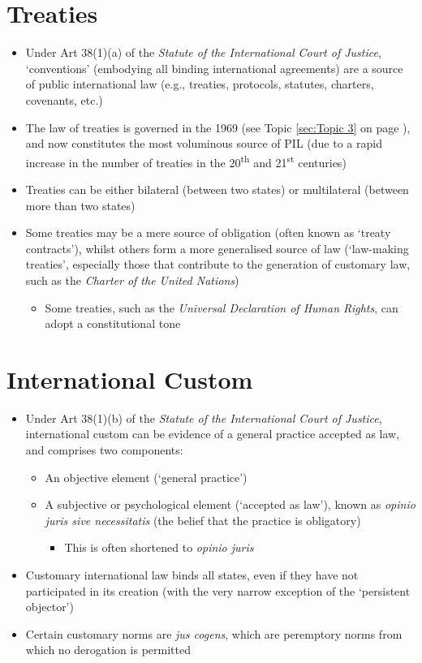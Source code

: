 \section{Treaties}
\begin{itemize}
    \item Under Art 38(1)(a) of the \textit{Statute of the International Court of Justice}, `conventions' (embodying all binding international agreements) are a source of public international law (e.g., treaties, protocols, statutes, charters, covenants, etc.)
    \item The law of treaties is governed in the 1969  (see Topic \ref{sec:Topic 3} on page \pageref{sec:Topic 3}), and now constitutes the most voluminous source of PIL (due to a rapid increase in the number of treaties in the 20\textsuperscript{th} and 21\textsuperscript{st} centuries)
    \item Treaties can be either bilateral (between two states) or multilateral (between more than two states)
    \item Some treaties may be a mere source of obligation (often known as `treaty contracts'), whilst others form a more generalised source of law (`law-making treaties', especially those that contribute to the generation of customary law, such as the \textit{Charter of the United Nations})
    \begin{itemize}
        \item Some treaties, such as the \textit{Universal Declaration of Human Rights}, can adopt a constitutional tone
    \end{itemize}
\end{itemize}

\section{International Custom}
\begin{itemize}
    \item Under Art 38(1)(b) of the \textit{Statute of the International Court of Justice}, international custom can be evidence of a general practice accepted as law, and comprises two components:
    \begin{itemize}
        \item An objective element (`general practice')
        \item A subjective or psychological element (`accepted as law'), known as \textit{opinio juris sive necessitatis} (the belief that the practice is obligatory)
        \begin{itemize}
            \item This is often shortened to \textit{opinio juris}
        \end{itemize}
    \end{itemize}
    \item Customary international law binds all states, even if they have not participated in its creation (with the very narrow exception of the `persistent objector')
    \item Certain customary norms are \textit{jus cogens}, which are peremptory norms from which no derogation is permitted
\end{itemize}

